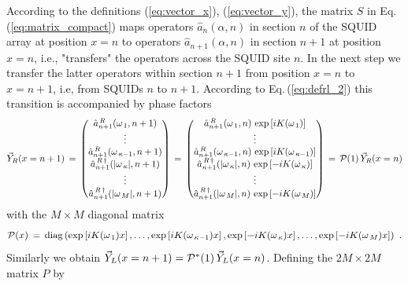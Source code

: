According to the definitions (\ref{eq:vector_x}), (\ref{eq:vector_y}), the matrix $S$ 
in Eq.\,(\ref{eq:matrix_compact}) maps operators $\hat{a}_n(\alpha,n)$ in  
section $n$ of the SQUID array at position $x=n$ to operators $\hat{a}_{n+1}(\alpha,n)$ in
section $n+1$ at position $x=n$, i.e., "transfers" the operators across the SQUID site $n$. 
In the next step we transfer the latter operators within section $n+1$ from position $x=n$
to $x=n+1$, i.e, from SQUIDs $n$ to $n+1$. According to Eq.\,(\ref{eq:defrl_2}) this
transition is accompanied by phase factors 
%
\begin{equation} \label{eq:vector_y2}
\vec{Y}_R(x=n+1) \, = \, 
\begin{pmatrix}
\hat{a}_{n+1}^{\,R}(\omega_{\,1},n+1) \\
\vdots \\
\hat{a}_{n+1}^{\,R}(\omega_{\,\kappa-1},n+1) \\
\hat{a}_{n+1}^{\,R\,\dagger}(|\omega_{\,\kappa}|,n+1) \\
\vdots \\
\hat{a}_{n+1}^{\,R\,\dagger}(|\omega_{\,M}|,n+1) \\
\end{pmatrix}
\, = \, 
\begin{pmatrix}
\hat{a}_{n+1}^{\,R}(\omega_{\,1},n) \, \exp\left[i K(\omega_{\,1}) \right] \\
\vdots \\
\hat{a}_{n+1}^{\,R}(\omega_{\,\kappa-1},n) \, \exp\left[i K(\omega_{\,\kappa-1}) \right] \\
\hat{a}_{n+1}^{\,R\,\dagger}(|\omega_{\,\kappa}|,n) \, \exp\left[- i K(\omega_{\,\kappa}) \right] \\
\vdots \\
\hat{a}_{n+1}^{\,R\,\dagger}(|\omega_{\,M}|,n) \, \exp\left[- i K(\omega_{\,M}) \right] \\
\end{pmatrix}
\, = \,
{\cal P}(1) \, \vec{Y}_R(x=n)
\end{equation}
%
with the $M \times M$ diagonal matrix
%
\begin{equation} \label{eq:matrix_p}
{\cal P}(x) \, = \, \text{diag}\left(\exp\left[i K(\omega_{\,1}) x \right], \ldots, 
\exp\left[i K(\omega_{\,\kappa-1}) x \right],
\exp\left[- i K(\omega_{\,\kappa}) x  \right], \ldots,
\exp\left[- i K(\omega_{\,M}) x \right] \right) \, \, .
\end{equation}
%
Similarly we obtain $\vec{Y}_L(x=n+1) = {\cal P}^*(1) \, \vec{Y}_L(x=n)$. 
Defining the $2M \times 2M$ matrix $P$ by
